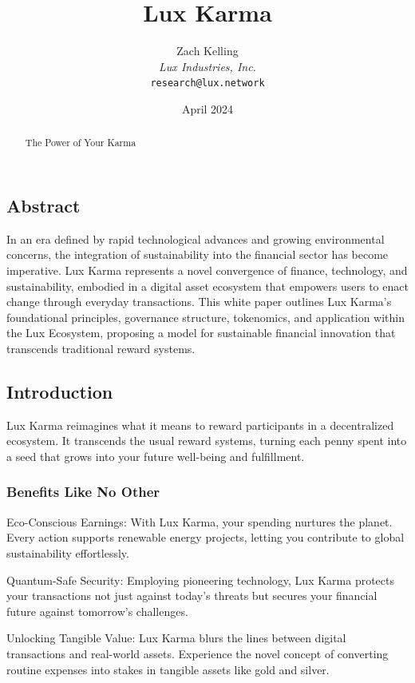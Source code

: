 \documentclass[11pt]{article}
\title{Lux Karma}
\author{Zach Kelling\\\textit{Lux Industries, Inc.}\\\texttt{research@lux.network}}
\date{April 2024}
\begin{document}
\luxcoverpage

\begin{abstract}
The Power of Your Karma
\end{abstract}

\tableofcontents
\newpage


\subsection{Abstract}

In an era defined by rapid technological advances and growing environmental concerns, the integration of sustainability into the financial sector has become imperative. Lux Karma represents a novel convergence of finance, technology, and sustainability, embodied in a digital asset ecosystem that empowers users to enact change through everyday transactions. This white paper outlines Lux Karma's foundational principles, governance structure, tokenomics, and application within the Lux Ecosystem, proposing a model for sustainable financial innovation that transcends traditional reward systems.


\subsection{Introduction}

Lux Karma reimagines what it means to reward participants in a decentralized ecosystem. It transcends the usual reward systems, turning each penny spent into a seed that grows into your future well-being and fulfillment.


\subsubsection{Benefits Like No Other}

Eco-Conscious Earnings: With Lux Karma, your spending nurtures the planet. Every action supports renewable energy projects, letting you contribute to global sustainability effortlessly.


Quantum-Safe Security: Employing pioneering technology, Lux Karma protects your transactions not just against today's threats but secures your financial future against tomorrow's challenges.


Unlocking Tangible Value: Lux Karma blurs the lines between digital transactions and real-world assets. Experience the novel concept of converting routine expenses into stakes in tangible assets like gold and silver.
\end{document}
